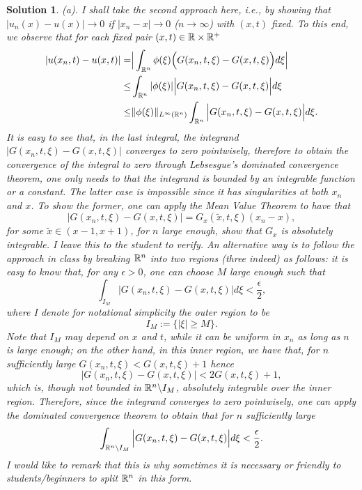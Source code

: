 \documentclass[6pt]{article}
\newtheorem{solution}{Solution}
\numberwithin{equation}{section}
\def\mathbb{\Bbb}
\begin{document}
\begin{enumerate}
\begin{solution}
(a).  I shall take the second approach here, i.e., by showing that $|u_n(x)-u(x)|\rightarrow 0$ if $|x_n-x|\rightarrow 0$ ($n\rightarrow \infty$) with $(x,t)$ fixed.  To this end, we observe that for each fixed pair $(x,t) \in\mathbb R\times \mathbb R^+$
\begin{align}
|u(x_n,t)-u(x,t)|=&\Big|\int_{\mathbb R^n} \phi(\xi)\Big(G(x_n,t,\xi)-G(x,t,\xi)\Big)d\xi  \Big|  \nonumber\\
\leq & \int_{\mathbb R^n} |\phi(\xi)|\Big|G(x_n,t,\xi)-G(x,t,\xi)\Big|d\xi    \nonumber\\
\leq &\Vert\phi(\xi)\Vert_{L^\infty(\mathbb R^n)}\int_{\mathbb R^n} \Big|G(x_n,t,\xi)-G(x,t,\xi)\Big|d\xi.    \nonumber
\end{align}
It is easy to see that, in the last integral, the integrand $|G(x_n,t,\xi)-G(x,t,\xi)|$ converges to zero pointwisely, therefore to obtain the convergence of the integral to zero through Lebsesgue's dominated convergence theorem, one only needs to that the integrand is bounded by an integrable function or a constant.  The latter case is impossible since it has singularities at both $x_n$ and $x$.  To show the former, one can apply the Mean Value Theorem to have that
\[|G(x_n,t,\xi)-G(x,t,\xi)|=G_x(\tilde x,t,\xi)(x_n-x),\]
for some $\tilde x \in (x-1,x+1)$, for $n$ large enough, show that $G_x$ is absolutely integrable.  I leave this to the student to verify.  An alternative way is to follow the approach in class by breaking $\mathbb R^n$ into two regions (three indeed) as follows:  it is easy to know that, for any $\epsilon>0$, one can choose $M$ large enough such that
\[\int_{I_M} \Big|G(x_n,t,\xi)-G(x,t,\xi)\Big|d\xi<\frac{\epsilon}{2},\]
where I denote for notational simplicity the outer region to be
\[I_M:=\{|\xi|\geq M\}.\]
Note that $I_M$ may depend on $x$ and $t$, while it can be uniform in $x_n$ as long as $n$ is large enough; on the other hand, in this inner region, we have that, for $n$ sufficiently large $G(x_n,t,\xi)<G(x,t,\xi)+1$ hence
\[|G(x_n,t,\xi)-G(x,t,\xi)|<2G(x,t,\xi)+1,\]
which is, though not bounded in $\mathbb R^n\backslash I_M$, absolutely integrable over the inner region.  Therefore, since the integrand converges to zero pointwisely, one can apply the dominated convergence theorem to obtain that for $n$ sufficiently large
\[\int_{\mathbb R^n\backslash I_M} \Big|G(x_n,t,\xi)-G(x,t,\xi)\Big|d\xi<\frac{\epsilon}{2}.\]
I would like to remark that this is why sometimes it is necessary or friendly to students/beginners to split $\mathbb R^n$ in this form.


\end{solution}
\end{enumerate}
\end{document}
